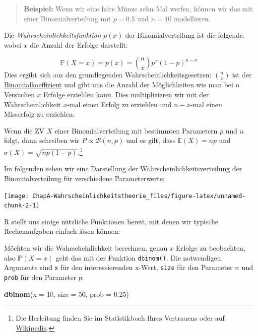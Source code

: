 \documentclass[]{book}
\newenvironment{Shaded}{\begin{snugshade}}{\end{snugshade}}
\newcommand{\KeywordTok}[1]{\textcolor[rgb]{0.13,0.29,0.53}{\textbf{#1}}}
\newcommand{\DataTypeTok}[1]{\textcolor[rgb]{0.13,0.29,0.53}{#1}}
\newcommand{\DecValTok}[1]{\textcolor[rgb]{0.00,0.00,0.81}{#1}}
\newcommand{\FloatTok}[1]{\textcolor[rgb]{0.00,0.00,0.81}{#1}}
\newcommand{\NormalTok}[1]{#1}
\let\rmarkdownfootnote\footnote%
\def\footnote{\protect\rmarkdownfootnote}
\begin{document}
\begin{quote}
\textbf{Beispiel:} Wenn wir eine faire Münze zehn Mal werfen, können wir
das mit einer Binomialverteilung mit \(p=0.5\) und \(n=10\) modellieren.
\end{quote}

Die \emph{Wahrscheinlichkeitsfunktion} \(p(x)\) der Binomialverteilung
ist die folgende, wobei \(x\) die Anzahl der Erfolge darstellt:

\[\mathbb{P}(X=x)=p(x)=\binom{n}{x}p^x(1-p)^{n-x}\] Dies ergibt sich aus
den grundlegenden Wahrscheinlichkeitsgesetzen: \(\binom{n}{x}\) ist der
\href{https://de.wikipedia.org/wiki/Binomialkoeffizient}{Binomialkoeffizient}
und gibt uns die Anzahl der Möglichkeiten wie man bei \(n\) Versuchen
\(x\) Erfolge erziehlen kann. Dies multiplizieren wir mit der
Wahrscheinlichkeit \(x\)-mal einen Erfolg zu erziehlen und \(n-x\)-mal
einen Misserfolg zu erziehlen.

Wenn die ZV \(X\) einer Binomialverteilung mit bestimmten Parametern
\(p\) und \(n\) folgt, dann schreiben wir \(P \propto \mathcal{B}(n,p)\)
und es gilt, dass \(\mathbb{E}(X)=np\) und
\(\sigma(X)=\sqrt{np(1-p)}\).\footnote{Die Herleitung finden Sie im
  Statistikbuch Ihres Vertrauens oder auf
  \href{https://de.wikipedia.org/wiki/Binomialverteilung\#Erwartungswert}{Wikipedia}.}

Im folgenden sehen wir eine Darstellung der
Wahrscheinlichkeitsverteilung der Binomialverteilung für verschiedene
Parameterwerte:

\begin{center}\texttt{[image: ChapA-Wahrscheinlichkeitstheorie\_files/figure-latex/unnamed-chunk-2-1]} \end{center}

R stellt uns einige nützliche Funktionen bereit, mit denen wir typische
Rechenaufgaben einfach lösen können:

Möchten wir die Wahrscheinlichkeit berechnen, genau \(x\) Erfolge zu
beobachten, also \(\mathbb{P}(X=x)\) geht das mit der Funktion
\texttt{dbinom()}. Die notwendigen Argumente sind \texttt{x} für den
interessierenden x-Wert, \texttt{size} für den Parameter \(n\) und
\texttt{prob} für den Parameter \(p\):

\begin{Shaded}
\begin{Highlighting}[]
\KeywordTok{dbinom}\NormalTok{(}\DataTypeTok{x =} \DecValTok{10}\NormalTok{, }\DataTypeTok{size =} \DecValTok{50}\NormalTok{, }\DataTypeTok{prob =} \FloatTok{0.25}\NormalTok{)}
\end{Highlighting}
\end{Shaded}
\end{document}
